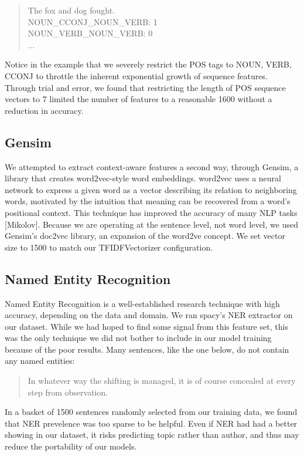 \documentclass[12pt]{article}
\begin{document}
\begin{enumerate}
  \begin{quote}
  The fox and dog fought. \\
  NOUN\_CCONJ\_NOUN\_VERB: 1\\
  NOUN\_VERB\_NOUN\_VERB: 0\\
  ...
  \end{quote}

  Notice in the example that we severely restrict the POS tags to NOUN, VERB, CCONJ to throttle the inherent exponential growth of sequence features. Through trial and error, we found that restricting the length of POS sequence vectors to 7 limited the number of features to a reasonable 1600 without a reduction in accuracy.
\end{enumerate}

\subsection{Gensim}
We attempted to extract context-aware features a second way, through Gensim, a library that creates word2vec-style word embeddings. word2vec uses a neural network to express a given word as a vector describing its relation to neighboring words, motivated by the intuition that meaning can be recovered from a word's positional context. This technique has improved the accuracy of many NLP tasks [Mikolov]. Because we are operating at the sentence level, not word level, we used Gensim's doc2vec library, an expansion of the word2ve concept. We set vector size to 1500 to match our TFIDFVectorizer configuration.

\subsection{Named Entity Recognition}
Named Entity Recognition is a well-established research technique with high accuracy, depending on the data and domain. We ran spacy's NER extractor on our dataset. While we had hoped to find some signal from this feature set, this was the only technique we did not bother to include in our model training because of the poor results. Many sentences, like the one below, do not contain any named entities:

\begin{quote}
In whatever way the shifting is managed, it is of course concealed at every step from observation.
\end{quote}

In a basket of 1500 sentences randomly selected from our training data, we found that NER prevelence was too sparse to be helpful. Even if NER had had a better showing in our dataset, it risks predicting topic rather than author, and thus may reduce the portability of our models.
\end{document}
